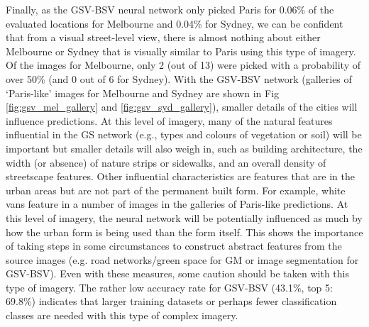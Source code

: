\documentclass[Crown,sageh,times]{sagej}
\begin{document}
Finally, as the GSV-BSV neural network only picked Paris for 0.06\% of the evaluated locations for Melbourne and 0.04\% for Sydney, we can be confident that from a visual street-level view, there is almost nothing about either Melbourne or Sydney that is visually similar to Paris using this type of imagery. Of the images for Melbourne, only 2 (out of 13) were picked with a probability of over 50\% (and 0 out of 6 for Sydney). With the GSV-BSV network (galleries of `Paris-like' images for Melbourne and Sydney are shown in Fig \ref{fig:gsv_mel_gallery} and \ref{fig:gsv_syd_gallery}), smaller details of the cities will influence predictions. At this level of imagery, many of the natural features influential in the GS network (e.g., types and colours of vegetation or soil) will be important but smaller details will also weigh in, such as building architecture, the width (or absence) of nature strips or sidewalks, and an overall density of streetscape features. Other influential characteristics are features that are in the urban areas but are not part of the permanent built form. For example, white vans feature in a number of images in the galleries of Paris-like predictions. At this level of imagery, the neural network will be potentially influenced as much by how the urban form is being used than the form itself. This shows the importance of taking steps in some circumstances to construct abstract features from the source images (e.g. road networks/green space for GM or image segmentation for GSV-BSV). Even with these measures, some caution should be taken with this type of imagery. The rather low accuracy rate for GSV-BSV (43.1\%, top 5: 69.8\%) indicates that larger training datasets or perhaps fewer classification classes are needed with this type of complex imagery.
\end{document}
